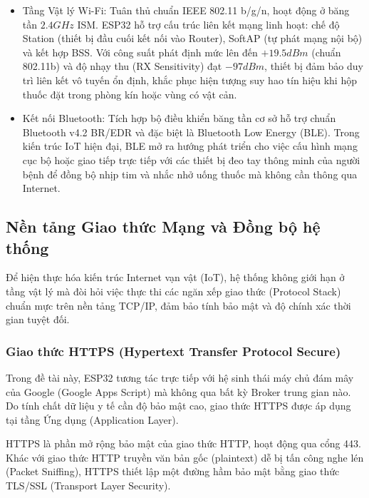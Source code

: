 \documentclass[12pt, a4paper, oneside]{article}
\begin{document}
\begin{itemize}
    \item Tầng Vật lý Wi-Fi: Tuân thủ chuẩn IEEE 802.11 b/g/n, hoạt động ở băng tần $2.4 GHz$ ISM. ESP32 hỗ trợ cấu trúc liên kết mạng linh hoạt: chế độ Station (thiết bị đầu cuối kết nối vào Router), SoftAP (tự phát mạng nội bộ) và kết hợp BSS. Với công suất phát định mức lên đến $+19.5 dBm$ (chuẩn 802.11b) và độ nhạy thu (RX Sensitivity) đạt $-97 dBm$, thiết bị đảm bảo duy trì liên kết vô tuyến ổn định, khắc phục hiện tượng suy hao tín hiệu khi hộp thuốc đặt trong phòng kín hoặc vùng có vật cản.
    \item Kết nối Bluetooth: Tích hợp bộ điều khiển băng tần cơ sở hỗ trợ chuẩn Bluetooth v4.2 BR/EDR và đặc biệt là Bluetooth Low Energy (BLE). Trong kiến trúc IoT hiện đại, BLE mở ra hướng phát triển cho việc cấu hình mạng cục bộ hoặc giao tiếp trực tiếp với các thiết bị đeo tay thông minh của người bệnh để đồng bộ nhịp tim và nhắc nhở uống thuốc mà không cần thông qua Internet.
\end{itemize}
\subsection{Nền tảng Giao thức Mạng và Đồng bộ hệ thống}

Để hiện thực hóa kiến trúc Internet vạn vật (IoT), hệ thống không giới hạn ở tầng vật lý mà đòi hỏi việc thực thi các ngăn xếp giao thức (Protocol Stack) chuẩn mực trên nền tảng TCP/IP, đảm bảo tính bảo mật và độ chính xác thời gian tuyệt đối.

\subsubsection{Giao thức HTTPS (Hypertext Transfer Protocol Secure)}

Trong đề tài này, ESP32 tương tác trực tiếp với hệ sinh thái máy chủ đám mây của Google (Google Apps Script) mà không qua bất kỳ Broker trung gian nào. Do tính chất dữ liệu y tế cần độ bảo mật cao, giao thức HTTPS được áp dụng tại tầng Ứng dụng (Application Layer).

HTTPS là phần mở rộng bảo mật của giao thức HTTP, hoạt động qua cổng 443. Khác với giao thức HTTP truyền văn bản gốc (plaintext) dễ bị tấn công nghe lén (Packet Sniffing), HTTPS thiết lập một đường hầm bảo mật bằng giao thức TLS/SSL (Transport Layer Security).
\end{document}
